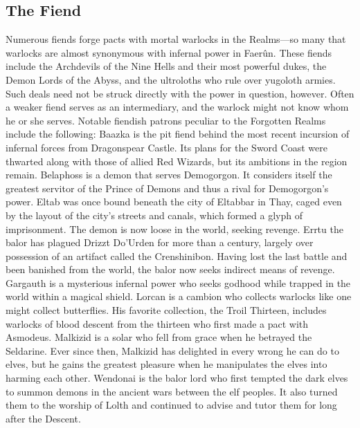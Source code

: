 \documentclass[10pt,a4paper,twoside,twocolumn,openany,bg=print,nodeprecatedcode]{dndbook}
\begin{document}
\subsection{The Fiend}
Numerous fiends forge pacts with mortal warlocks in the Realms—so many that warlocks are almost synonymous with infernal power in Faerûn. These fiends include the Archdevils of the Nine Hells and their most powerful dukes, the Demon Lords of the Abyss, and the ultroloths who rule over yugoloth armies. Such deals need not be struck directly with the power in question, however. Often a weaker fiend serves as an intermediary, and the warlock might not know whom he or she serves. Notable fiendish patrons peculiar to the Forgotten Realms include the following: Baazka is the pit fiend behind the most recent incursion of infernal forces from Dragonspear Castle. Its plans for the Sword Coast were thwarted along with those of allied Red Wizards, but its ambitions in the region remain. Belaphoss is a demon that serves Demogorgon. It considers itself the greatest servitor of the Prince of Demons and thus a rival for Demogorgon's power. Eltab was once bound beneath the city of Eltabbar in Thay, caged even by the layout of the city's streets and canals, which formed a glyph of imprisonment. The demon is now loose in the world, seeking revenge. Errtu the balor has plagued Drizzt Do'Urden for more than a century, largely over possession of an artifact called the Crenshinibon. Having lost the last battle and been banished from the world, the balor now seeks indirect means of revenge. Gargauth is a mysterious infernal power who seeks godhood while trapped in the world within a magical shield. Lorcan is a cambion who collects warlocks like one might collect butterflies. His favorite collection, the Troil Thirteen, includes warlocks of blood descent from the thirteen who first made a pact with Asmodeus. Malkizid is a solar who fell from grace when he betrayed the Seldarine. Ever since then, Malkizid has delighted in every wrong he can do to elves, but he gains the greatest pleasure when he manipulates the elves into harming each other. Wendonai is the balor lord who first tempted the dark elves to summon demons in the ancient wars between the elf peoples. It also turned them to the worship of Lolth and continued to advise and tutor them for long after the Descent.
\end{document}
